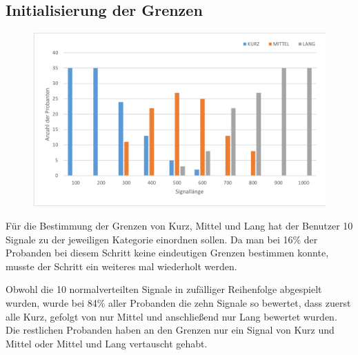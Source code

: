 \subsection{Initialisierung der Grenzen}
\label{ch:Evolution{\"a}rer Algorithmus:sec:Studiendesign}

\begin{figure}[htbp] 
            \centering
   	\includegraphics[width=\textwidth]{pics/analyse/Initialisierung.png}
	\caption{}
	\label{fig:Initialisierung}
\end{figure}

F{\"u}r die Bestimmung der Grenzen von Kurz, Mittel und Lang hat der Benutzer 10 Signale zu der jeweiligen Kategorie einordnen sollen. 
Da man bei 16\% der Probanden bei diesem Schritt keine eindeutigen Grenzen bestimmen konnte, musste der Schritt ein weiteres mal wiederholt werden. 

Obwohl die 10 normalverteilten Signale in zuf{\"a}lliger Reihenfolge abgespielt wurden, wurde bei 84\% aller Probanden die zehn Signale so bewertet, dass zuerst alle Kurz, gefolgt von nur Mittel und anschlie{\ss}end nur Lang bewertet wurden. Die restlichen Probanden haben an den Grenzen nur ein Signal von Kurz und Mittel oder Mittel und Lang vertauscht gehabt.



